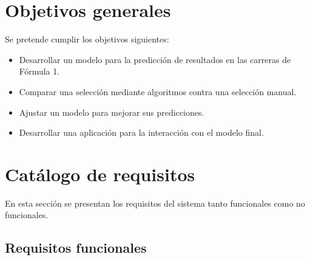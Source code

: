 \section{Objetivos generales}

Se pretende cumplir los objetivos siguientes:

\begin{itemize}
\tightlist
\item
  Desarrollar un modelo para la predicción de resultados en las carreras de Fórmula 1.
\item
  Comparar una selección mediante algoritmos contra una selección manual.
\item
  Ajustar un modelo para mejorar sus predicciones.
\item
  Desarrollar una aplicación para  la interacción con el modelo final.
\end{itemize}


\section{Catálogo de requisitos}

En esta sección se presentan los requisitos del sistema tanto funcionales como no funcionales.

\subsection{Requisitos funcionales}

